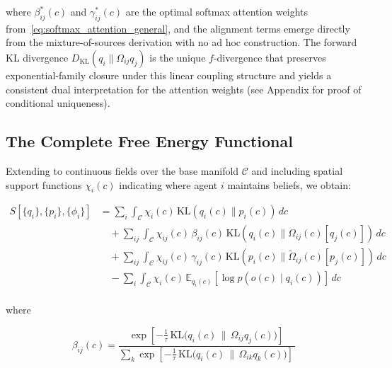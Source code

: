 \documentclass[11pt]{article}
\begin{document}
where $\beta^*_{ij}(c)$ and $\gamma^*_{ij}(c)$ are the optimal softmax attention weights from~\eqref{eq:softmax_attention_general}, and the alignment terms emerge directly from the mixture-of-sources derivation with no ad hoc construction. The forward KL divergence $D_{\mathrm{KL}}(q_i \| \Omega_{ij}q_j)$ is the unique $f$-divergence that preserves exponential-family closure under this linear coupling structure and yields a consistent dual interpretation for the attention weights (see Appendix for proof of conditional uniqueness).

\subsection{The Complete Free Energy Functional}

Extending to continuous fields over the base manifold $\mathcal{C}$ and including spatial support functions $\chi_i(c)$ indicating where agent $i$ maintains beliefs, we obtain:

\begin{equation}
\boxed{
\begin{aligned}
S[\{q_i\}, \{p_i\}, \{\phi_i\}] 
&= \sum_i \int_{\mathcal{C}} \chi_i(c) \, \mathrm{KL}(q_i(c) \| p_i(c)) \, dc \\
&\quad + \sum_{ij} \int_{\mathcal{C}} \chi_{ij}(c) \, \beta_{ij}(c) \, \mathrm{KL}(q_i(c) \| \Omega_{ij}(c)[q_j(c)]) \, dc \\
&\quad + \sum_{ij} \int_{\mathcal{C}} \chi_{ij}(c) \, \gamma_{ij}(c) \, \mathrm{KL}(p_i(c) \| \tilde{\Omega}_{ij}(c)[p_j(c)]) \, dc \\
&\quad - \sum_i \int_{\mathcal{C}} \chi_i(c) \, \mathbb{E}_{q_i(c)}[\log p(o(c) \mid q_i(c))] \, dc \\
\end{aligned}
}
\label{eq:free_energy_functional_final}
\end{equation}

where 

$$
\beta_{ij}(c) =
\frac{
  \exp\!\left[
    -\tfrac{1}{\tau}\,
    \mathrm{KL}\!\big(
      q_i(c)
      \,\big\|\,
      \Omega_{ij}q_j(c)
    \big)
  \right]
  \, 
}{
  \displaystyle
  \sum_{k}
  \exp\!\left[
    -\tfrac{1}{\tau}\,
    \mathrm{KL}\!\big(
      q_i(c)
      \,\big\|\,
      \Omega_{ik}q_k(c)
    \big)
  \right]
  \, 
}
$$
\end{document}
